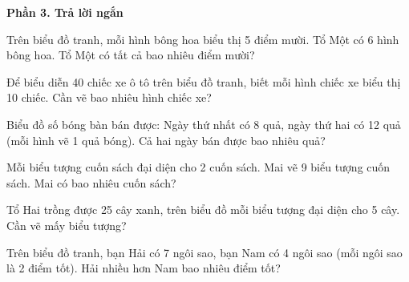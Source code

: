 \textbf{Phần 3. Trả lời ngắn}

\begin{ex} %
Trên biểu đồ tranh, mỗi hình bông hoa biểu thị 5 điểm mười. Tổ Một có 6 hình bông hoa. Tổ Một có tất cả bao nhiêu điểm mười?
\end{ex}

\begin{ex} %
Để biểu diễn 40 chiếc xe ô tô trên biểu đồ tranh, biết mỗi hình chiếc xe biểu thị 10 chiếc. Cần vẽ bao nhiêu hình chiếc xe?
\end{ex}

\begin{ex} %
Biểu đồ số bóng bàn bán được: Ngày thứ nhất có 8 quả, ngày thứ hai có 12 quả (mỗi hình vẽ 1 quả bóng). Cả hai ngày bán được bao nhiêu quả?
\end{ex}

\begin{ex} %
Mỗi biểu tượng cuốn sách đại diện cho 2 cuốn sách. Mai vẽ 9 biểu tượng cuốn sách. Mai có bao nhiêu cuốn sách?
\end{ex}

\begin{ex} %
Tổ Hai trồng được 25 cây xanh, trên biểu đồ mỗi biểu tượng đại diện cho 5 cây. Cần vẽ mấy biểu tượng?
\end{ex}

\begin{ex} %
Trên biểu đồ tranh, bạn Hải có 7 ngôi sao, bạn Nam có 4 ngôi sao (mỗi ngôi sao là 2 điểm tốt). Hải nhiều hơn Nam bao nhiêu điểm tốt?
\end{ex}
